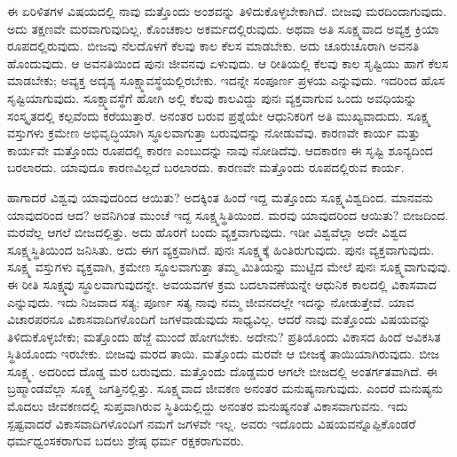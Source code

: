 \vskip 0.2cm

ಈ ಏರಿಳಿತಗಳ ವಿಷಯದಲ್ಲಿ ನಾವು ಮತ್ತೊಂದು ಅಂಶವನ್ನು ತಿಳಿದುಕೊಳ್ಳಬೇಕಾಗಿದೆ. ಬೀಜವು ಮರದಿಂದಾಗುವುದು. ಅದು ತಕ್ಷಣವೇ ಮರವಾಗುವುದಿಲ್ಲ. ಕೊಂಚಕಾಲ ಅಕರ್ಮದಲ್ಲಿರುವುದು. ಅಥವಾ ಅತಿ ಸೂಕ್ಷ್ಮವಾದ ಅವ್ಯಕ್ತ ಕ್ರಿಯಾ ರೂಪದಲ್ಲಿರುವುದು. ಬೀಜವು ನೆಲದೊಳಗೆ ಕೆಲವು ಕಾಲ ಕೆಲಸ ಮಾಡಬೇಕು. ಅದು ಚೂರುಚೂರಾಗಿ ಅವನತಿ ಹೊಂದುವುದು. ಆ ಅವನತಿಯಿಂದ ಪುನಃ ಜೀವನವು ಏಳುವುದು. ಆ ರೀತಿಯಲ್ಲಿ ಕೆಲವು ಕಾಲ ಸೃಷ್ಟಿಯು ಹಾಗೆ ಕೆಲಸ ಮಾಡಬೇಕು; ಅವ್ಯಕ್ತ ಅದೃಶ್ಯ ಸೂಕ್ಷ್ಮಾವಸ್ಥೆಯಲ್ಲಿರಬೇಕು. ಇದನ್ನೇ ಸಂಪೂರ್ಣ ಪ್ರಳಯ ಎನ್ನುವುದು. ಇದರಿಂದ ಹೊಸ ಸೃಷ್ಟಿಯಾಗುವುದು. ಸೂಕ್ಷ್ಮಾವಸ್ಥೆಗೆ ಹೋಗಿ ಅಲ್ಲಿ ಕೆಲವು ಕಾಲವಿದ್ದು ಪುನಃ ವ್ಯಕ್ತವಾಗುವ ಒಂದು ಅವಧಿಯನ್ನು ಸಂಸ್ಕೃತದಲ್ಲಿ ಕಲ್ಪವೆಂದು ಕರೆಯುತ್ತಾರೆ. ಅನಂತರ ಬರುವ ಪ್ರಶ್ನೆಯೇ ಆಧುನಿಕರಿಗೆ ಅತಿ ಮುಖ್ಯವಾದುದು. ಸೂಕ್ಷ್ಮ ವಸ್ತುಗಳು ಕ್ರಮೇಣ ಅಭಿವೃದ್ಧಿಯಾಗಿ ಸ್ಥೂಲವಾಗುತ್ತಾ ಬರುವುದನ್ನು ನೋಡುವೆವು. ಕಾರಣವೇ ಕಾರ್ಯ ಮತ್ತು ಕಾರ್ಯವೇ ಮತ್ತೊಂದು ರೂಪದಲ್ಲಿ ಕಾರಣ ಎಂಬುದನ್ನು ನಾವು ನೋಡಿದೆವು. ಆದಕಾರಣ ಈ ಸೃಷ್ಟಿ ಶೂನ್ಯದಿಂದ ಬರಲಾರದು. ಯಾವುದೂ ಕಾರಣವಿಲ್ಲದೆ ಬರಲಾರದು. ಕಾರಣವೇ ಮತ್ತೊಂದು ರೂಪದಲ್ಲಿರುವ ಕಾರ್ಯ.


ಹಾಗಾದರೆ ವಿಶ್ವವು ಯಾವುದರಿಂದ ಆಯಿತು? ಅದಕ್ಕಿಂತ ಹಿಂದೆ ಇದ್ದ ಮತ್ತೊಂದು ಸೂಕ್ಷ್ಮವಿಶ್ವದಿಂದ. ಮಾನವನು ಯಾವುದರಿಂದ ಆದ? ಅವನಿಗಿಂತ ಮುಂಚೆ ಇದ್ದ ಸೂಕ್ಷ್ಮಸ್ಥಿತಿಯಿಂದ. ಮರವು ಯಾವುದರಿಂದ ಆಯಿತು? ಬೀಜದಿಂದ. ಮರವೆಲ್ಲ ಆಗಲೆ ಬೀಜದಲ್ಲಿತ್ತು. ಅದು ಹೊರಗೆ ಬಂದು ವ್ಯಕ್ತವಾಗುವುದು. ಇಡೀ ವಿಶ್ವವೆಲ್ಲಾ ಅದೇ ವಿಶ್ವದ ಸೂಕ್ಷ್ಮಸ್ಥಿತಿಯಿಂದ ಜನಿಸಿತು. ಅದು ಈಗ ವ್ಯಕ್ತವಾಗಿದೆ. ಪುನಃ ಸೂಕ್ಷ್ಮಕ್ಕೆ ಹಿಂತಿರುಗುವುದು. ಪುನಃ ವ್ಯಕ್ತವಾಗುವುದು. ಸೂಕ್ಷ್ಮ ವಸ್ತುಗಳು ವ್ಯಕ್ತವಾಗಿ, ಕ್ರಮೇಣ ಸ್ಥೂಲವಾಗುತ್ತಾ ತಮ್ಮ ಮಿತಿಯನ್ನು ಮುಟ್ಟಿದ ಮೇಲೆ ಪುನಃ ಸೂಕ್ಷ್ಮವಾಗುವುವು. ಈ ರೀತಿ ಸೂಕ್ಷ್ಮವು ಸ್ಥೂಲವಾಗುವುದನ್ನೇ. ಅವಯವಗಳ ಕ್ರಮ ಬದಲಾವಣೆಯನ್ನೇ ಆಧುನಿಕ ಕಾಲದಲ್ಲಿ ವಿಕಾಸವಾದ ಎನ್ನುವುದು. ಇದು ನಿಜವಾದ ಸತ್ಯ; ಪೂರ್ಣ ಸತ್ಯ ನಾವು ನಮ್ಮ ಜೀವನದಲ್ಲೇ ಇದನ್ನು ನೋಡುತ್ತೇವೆ. ಯಾವ ವಿಚಾರಪರನೂ ವಿಕಾಸವಾದಿಗಳೊಂದಿಗೆ ಜಗಳವಾಡುವುದು ಸಾಧ್ಯವಿಲ್ಲ. ಆದರೆ ನಾವು ಮತ್ತೊಂದು ವಿಷಯವನ್ನು ತಿಳಿದುಕೊಳ್ಳಬೇಕು; ಮತ್ತೊಂದು ಹೆಜ್ಜೆ ಮುಂದೆ ಹೋಗಬೇಕು. ಅದೇನು? ಪ್ರತಿಯೊಂದು ವಿಕಾಸದ ಹಿಂದೆ ಅವಿಕಸಿತ ಸ್ಥಿತಿಯೊಂದು ಇರಬೇಕು. ಬೀಜವು ಮರದ ತಾಯಿ. ಮತ್ತೊಂದು ಮರವೇ ಆ ಬೀಜಕ್ಕೆ ತಾಯಿಯಾಗಿರುವುದು. ಬೀಜ ಸೂಕ್ಷ್ಮ. ಅದರಿಂದ ದೊಡ್ಡ ಮರ ಬರುವುದು. ಮತ್ತೊಂದು ದೊಡ್ಡಮರ ಆಗಲೇ ಬೀಜದಲ್ಲಿ ಅಂತರ್ಗತವಾಗಿದೆ. ಈ ಬ್ರಹ್ಮಾಂಡವೆಲ್ಲಾ ಸೂಕ್ಷ್ಮ ಜಗತ್ತಿನಲ್ಲಿತ್ತು. ಸೂಕ್ಷ್ಮವಾದ ಜೀವಕಣ ಅನಂತರ ಮನುಷ್ಯನಾಗುವುದು. ಎಂದರೆ ಮನುಷ್ಯನು ಮೊದಲು ಜೀವಕಣದಲ್ಲಿ ಸುಪ್ತವಾಗಿರುವ ಸ್ಥಿತಿಯಲ್ಲಿದ್ದು ಅನಂತರ ಮನುಷ್ಯನಂತೆ ವಿಕಾಸವಾಗುವನು. ಇದು ಸ್ಪಷ್ಟವಾದರೆ ವಿಕಾಸವಾದಿಗಳೊಂದಿಗೆ ನಮಗೆ ಜಗಳವೇ ಇಲ್ಲ. ಅವರು ಇದೊಂದು ವಿಷಯವನ್ನೊಪ್ಪಿಕೊಂಡರೆ ಧರ್ಮಧ್ವಂಸಕರಾಗುವ ಬದಲು ಶ್ರೇಷ್ಠ ಧರ್ಮ ರಕ್ಷಕರಾಗುವರು.



